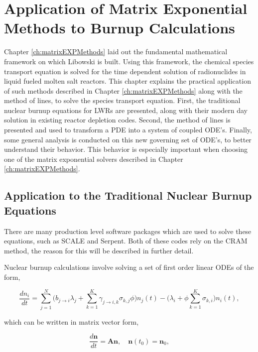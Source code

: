 \chapter{Application of Matrix Exponential Methods to Burnup Calculations}\label{ch:application}

Chapter \ref{ch:matrixEXPMethods} laid out the fundamental mathematical framework on which Libowski is built. Using this framework, the chemical species transport equation is solved for the time dependent solution of radionuclides in liquid fueled molten salt reactors. This chapter explains the practical application of such methods described in Chapter \ref{ch:matrixEXPMethods} along with the method of lines, to solve the species transport equation. First, the traditional nuclear burnup equations for LWRs are presented, along with their modern day solution in existing reactor depletion codes. Second, the method of lines is presented and used to transform a PDE into a system of coupled ODE's. Finally, some general analysis is conducted on this new governing set of ODE's, to better understand their behavior. This behavior is especially important when choosing one of the matrix exponential solvers described in Chapter \ref{ch:matrixEXPMethods}. 


\section{Application to the Traditional Nuclear Burnup Equations}
 There are many production level software packages which are used to solve these equations, such as SCALE and Serpent. Both of these codes rely on the CRAM method, the reason for this will be described in further detail. 

Nuclear burnup calculations involve solving a set of first order linear ODEs of the form,

\begin{equation}
    \frac{dn_{i}}{dt} = \sum_{j=1}^{N}\bigg(b_{j\rightarrow i}\lambda_{j} + 
    \sum_{k=1}^{K}\gamma_{j\rightarrow i,k}\sigma_{k,j}\phi \bigg)n_{j}(t) - \bigg(\lambda_{i} + \phi\sum_{k=1}^{K} \sigma_{k,i}\bigg)n_{i}(t),
\end{equation}

\noindent which can be written in matrix vector form,

\begin{equation}
    \frac{d\boldsymbol{n}}{dt} = \boldsymbol{A}\boldsymbol{n}, \quad \boldsymbol{n}(t_{0}) = \boldsymbol{n}_{0}, 
    \label{eq:burnup}
\end{equation}

